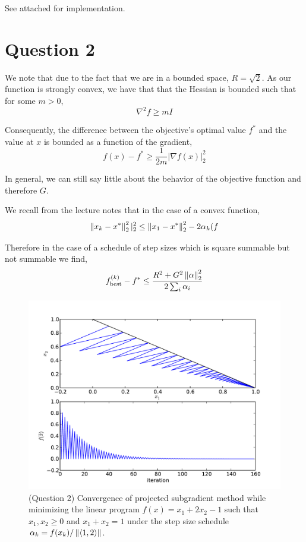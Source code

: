 \documentclass{article}
\begin{document}
See attached for implementation.

\section{Question 2}

We note that due to the fact that we are in a bounded space, $R =
\sqrt{2}$. As our function is strongly convex, we have that that the
Hessian is bounded such that for some $m > 0$,
\[ \nabla^2 f \ge m I \]

Consequently, the difference between the objective's optimal value
$f^*$ and the value at $x$ is bounded as a function of the gradient,
\[ f(x) - f^* \ge \frac{1}{2m} \vert \nabla f(x) \vert^2_2 \]

In general, we can still say little about the behavior of
the objective function and therefore $G$.

We recall from the lecture notes that in the case of a convex function,
\[ \left\lVert x_k - x^* \right\rVert_2^2 \vert_2^2 \le \left\lVert x_1 - x^* \right\rVert_2^2
   - 2\alpha_k (f \]

Therefore in the case of a schedule of step sizes which is square
summable but not summable we find,
\[ f_\mathrm{best}^{(k)} - f^* \le \frac{R^2 + G^2 \left\lVert \alpha \right\rVert_2^2}{2 \sum_i \alpha_i} \]

\begin{figure}
  \center
  \includegraphics[scale=0.2]{q2-convergence.pdf}
  \caption{(Question 2) Convergence of projected subgradient method
while minimizing the linear program $f(x) = x_1 + 2x_2 - 1$ such that
$x_1, x_2 \ge 0$ and $x_1 + x_2 = 1$ under the step size schedule
$\alpha_k = f(x_k) / \left\lVert \langle 1,2\rangle \right\rVert$.}
  \label{Fig:Q2Convergence}
\end{figure}
\end{document}
